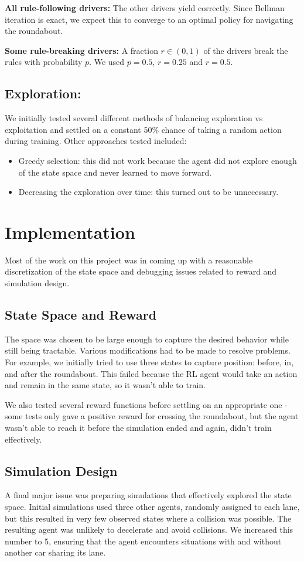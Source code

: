 \documentclass[conference]{IEEEtran}
\begin{document}
\textbf{All rule-following drivers:} The other drivers yield correctly. Since Bellman iteration is exact, we expect this to converge to an optimal policy for navigating the roundabout.

\textbf{Some rule-breaking drivers:} A fraction $r\in (0,1)$ of the drivers break the rules with probability $p$. We used $p=0.5$, $r=0.25$ and $r=0.5$.

\subsection{Exploration:} We initially tested several different methods of balancing exploration vs exploitation and settled on a constant 50\% chance of taking a random action during training. Other approaches tested included:
\begin{itemize}
	\item Greedy selection: this did not work because the agent did not explore enough of the state space and never learned to move forward.
	\item Decreasing the exploration over time: this turned out to be unnecessary.
\end{itemize}

\section{Implementation} Most of the work on this project was in coming up with a reasonable discretization of the state space and debugging issues related to reward and simulation design.

\subsection{State Space and Reward} The space was chosen to be large enough to capture the desired behavior while still being tractable. Various modifications had to be made to resolve problems.
For example, we initially tried to use three states to capture position: before, in, and after the roundabout. This failed because the RL agent would take an action and remain in the same state, so it wasn't able to train.

We also tested several reward functions before settling on an appropriate one - some tests only gave a positive reward for crossing the roundabout, but the agent wasn't able to reach it before the simulation ended and again, didn't train effectively.

\subsection{Simulation Design} A final major issue was preparing simulations that effectively explored the state space. Initial simulations used three other agents, randomly assigned to each lane, but this resulted in very few observed states where a collision was possible. The resulting agent was unlikely to decelerate and avoid collisions. We increased this number to 5, ensuring that the agent encounters situations with and without another car sharing its lane.
\end{document}
